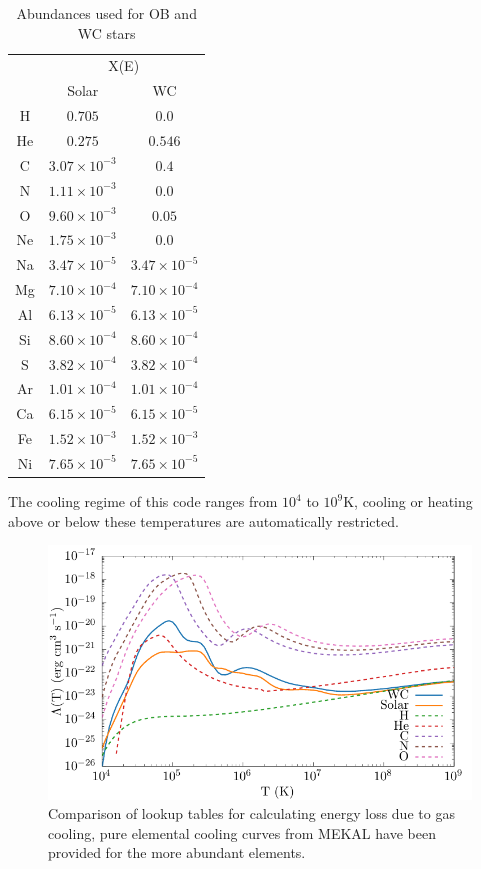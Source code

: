 \begin{table}[ht]
  \centering
  \begin{tabular}{@{}ccc@{}}
  \toprule
  \multicolumn{1}{l}{} & \multicolumn{2}{c}{X(E)} \\ \cmidrule(l){2-3} 
   & Solar & WC \\ \midrule
  H & $0.705$ & $0.0$ \\
  He & $0.275$ & $0.546$ \\
  C & $3.07 \times 10^{-3}$ & $0.4$ \\
  N & $1.11 \times 10^{-3}$ & $0.0$ \\
  O & $9.60 \times 10^{-3}$ & $0.05$ \\
  Ne & $1.75 \times 10^{-3}$ & $0.0$ \\
  Na & $3.47 \times 10^{-5}$ & $3.47 \times 10^{-5}$ \\
  Mg & $7.10 \times 10^{-4}$ & $7.10 \times 10^{-4}$ \\
  Al & $6.13 \times 10^{-5}$ & $6.13 \times 10^{-5}$ \\
  Si & $8.60 \times 10^{-4}$ & $8.60 \times 10^{-4}$ \\
  S & $3.82 \times 10^{-4}$ & $3.82 \times 10^{-4}$ \\
  Ar & $1.01 \times 10^{-4}$ & $1.01 \times 10^{-4}$ \\
  Ca & $6.15 \times 10^{-5}$ & $6.15 \times 10^{-5}$ \\
  Fe & $1.52 \times 10^{-3}$ & $1.52 \times 10^{-3}$ \\
  Ni & $7.65 \times 10^{-5}$ & $7.65 \times 10^{-5}$ \\ \bottomrule
  \end{tabular}
  \caption{Abundances used for OB and WC stars}
  \label{tab:abundances}
\end{table}

The cooling regime of this code ranges from $10^4$ to $10^9 \si{\kelvin}$, cooling or heating above or below these temperatures are automatically restricted.

\begin{figure}[ht]
  \centering
  \includegraphics{assets/cooling-curve/cooling-curve.pdf}
  \caption[WR and OB $\Lambda(T)$ cooling curves]{Comparison of lookup tables for calculating energy loss due to gas cooling, pure elemental cooling curves from MEKAL have been provided for the more abundant elements.}
  \label{fig:cooling-curve}
\end{figure}

